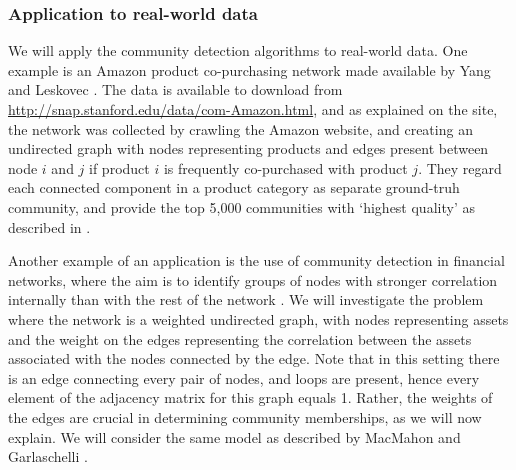 \documentclass[12pt]{article}
\numberwithin{equation}{section}
\begin{document}
\subsubsection{Application to real-world data}
\label{subsubsec:communityDetectionApplicationToRealWorldData}

We will apply the community detection algorithms to real-world data. One example is an Amazon product co-purchasing network made available by Yang and Leskovec \cite{YL12}. The data is available to download from \url{http://snap.stanford.edu/data/com-Amazon.html}, and as explained on the site, the network was collected by crawling the Amazon website, and creating an undirected graph with nodes representing products and edges present between node $i$ and $j$ if product $i$ is frequently co-purchased with product $j$. They regard each connected component in a product category as separate ground-truh community, and provide the top 5,000 communities with `highest quality' as described in \cite{YL12}.

Another example of an application is the use of community detection in financial networks, where the aim is to identify groups of nodes with stronger correlation internally than with the rest of the network \cite{MG13}. We will investigate the problem where the network is a weighted undirected graph, with nodes representing assets and the weight on the edges representing the correlation between the assets associated with the nodes connected by the edge. Note that in this setting there is an edge connecting every pair of nodes, and loops are present, hence every element of the adjacency matrix for this graph equals 1. Rather, the weights of the edges are crucial in determining community memberships, as we will now explain. We will consider the same model as described by MacMahon and Garlaschelli \cite{MG13}.
\end{document}
